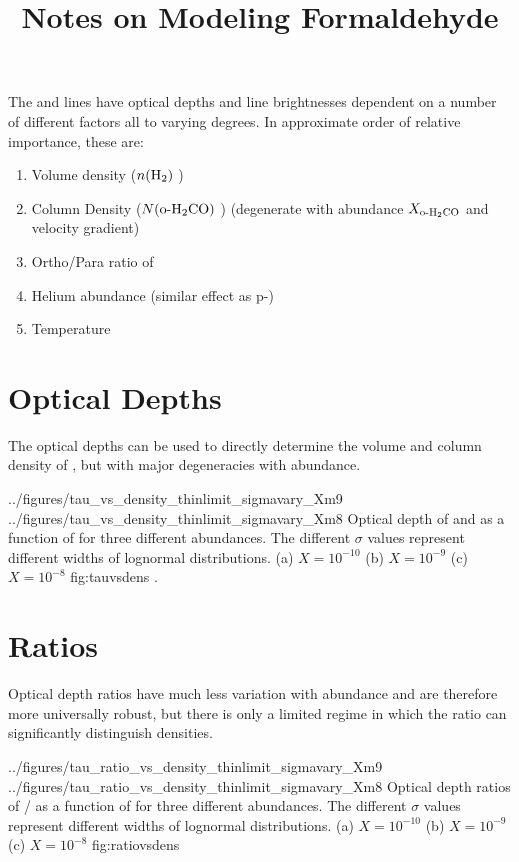
\title{Notes on Modeling Formaldehyde}

The \ortho \oneone and \twotwo lines have optical depths and line
brightnesses dependent on a number of different factors all to varying degrees.
In approximate order of relative importance, these are:

\begin{enumerate}
    \item Volume density ($n(\textrm{H}_{2})$ \percc)
    \item Column Density ($N(\textrm{o-H}_2\textrm{CO})$ \persc) \perkms
          (degenerate with abundance $X_{\textrm{o-H}_2\textrm{CO}}$ and velocity gradient)
    \item Ortho/Para ratio of \hh
    \item Helium abundance (similar effect as p-\hh)
    \item Temperature
\end{enumerate}


\section{Optical Depths}
The optical depths can be used to directly determine the volume and column
density of \ortho, but with major degeneracies with abundance.

               {../figures/tau_vs_density_thinlimit_sigmavary_Xm9}
               {../figures/tau_vs_density_thinlimit_sigmavary_Xm8}
{Optical depth of \ortho \oneone and \twotwo as a function of \dens for three
different abundances.  The different $\sigma$ values represent different widths
of lognormal distributions.
(a) $X=10^{-10}$ (b) $X=10^{-9}$ (c) $X=10^{-8}$
}
{fig:tauvsdens}
.

\section{Ratios}
Optical depth ratios have much less variation with abundance and are therefore more universally
robust, but there is only a limited regime in which the ratio can significantly distinguish densities.

               {../figures/tau_ratio_vs_density_thinlimit_sigmavary_Xm9}
               {../figures/tau_ratio_vs_density_thinlimit_sigmavary_Xm8}
{Optical depth ratios of \ortho \oneone / \twotwo as a function of \dens for three
different abundances.  The different $\sigma$ values represent different widths
of lognormal distributions.
(a) $X=10^{-10}$ (b) $X=10^{-9}$ (c) $X=10^{-8}$ }
{fig:ratiovsdens}


